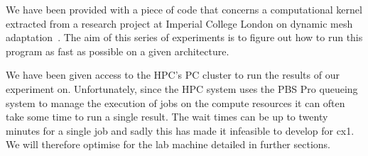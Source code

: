 We have been provided with a piece of code that concerns a computational kernel extracted from a research project at Imperial College London on dynamic mesh adaptation~\cite{pragmatic}.
The aim of this series of experiments is to figure out how to run this program as fast as possible on a given architecture.

We have been given access to the HPC's PC cluster to run the results of our experiment on.
Unfortunately, since the HPC system uses the PBS Pro queueing system to manage the execution of jobs on the compute resources it can often take some time to run a single result. The wait times can be up to twenty minutes for a single job and sadly this has made it infeasible to develop for cx1. We will therefore optimise for the lab machine detailed in further sections.
